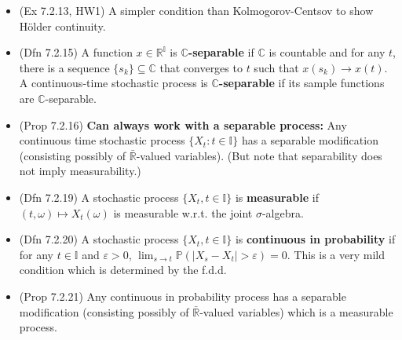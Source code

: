 \documentclass[twoside]{article}
\newcommand{\dis}{\displaystyle}
\newcommand\bbC{\mathbb{C}}
\newcommand\bbI{\mathbb{I}}
\newcommand\bbP{\mathbb{P}}
\newcommand\bbR{\mathbb{R}}
\def\eps{\varepsilon}
\newcommand\om{\omega}
\newcommand\sg{\sigma}
\newcommand\goesto{\rightarrow}
\begin{document}
\begin{itemize}
\item (Ex 7.2.13, HW1) A simpler condition than Kolmogorov-Centsov to show H\"{o}lder continuity.

\item (Dfn 7.2.15) A function $x \in \bbR^\bbI$ is \textbf{$\bbC$-separable} if $\bbC$ is countable and for any $t$, there is a sequence $\{s_k\} \subseteq \bbC$ that converges to $t$ such that $x(s_k) \goesto x(t)$. A continuous-time stochastic process is \textbf{$\bbC$-separable} if its sample functions are $\bbC$-separable.

\item (Prop 7.2.16) \textbf{Can always work with a separable process:} Any continuous time stochastic process $\{ X_t: t \in \bbI\}$ has a separable modification (consisting possibly of $\bar{\bbR}$-valued variables). (But note that separability does not imply measurability.)

\item (Dfn 7.2.19) A stochastic process $\{X_t, t \in \bbI\}$ is \textbf{measurable} if $(t, \om) \mapsto X_t(\om)$ is measurable w.r.t. the joint $\sg$-algebra.

\item (Dfn 7.2.20) A stochastic process $\{ X_t, t \in \bbI\}$ is \textbf{continuous in probability} if for any $t \in \bbI$ and $\eps > 0$, $\dis\lim_{s \goesto t} \bbP (|X_s - X_t| > \eps) = 0$. This is a very mild condition which is determined by the f.d.d.

\item (Prop 7.2.21) Any continuous in probability process has a separable modification (consisting possibly of $\bar{\bbR}$-valued variables) which is a measurable process.

\end{itemize}
\end{document}

